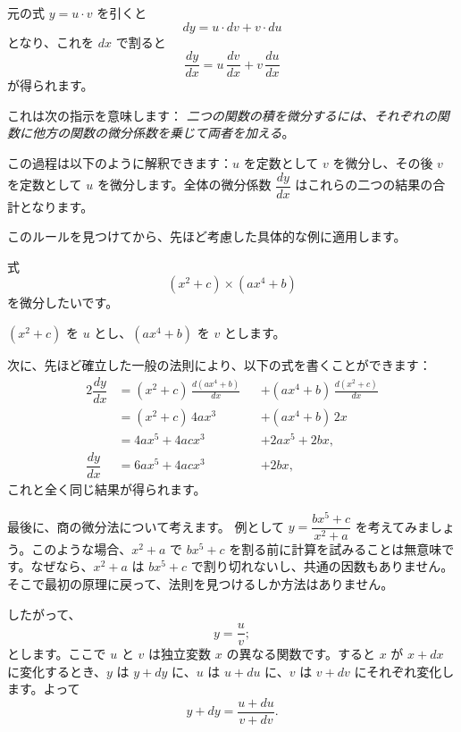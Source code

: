 \documentclass[a4paper,11pt,openany]{ltjsbook}
\begin{document}
元の式 $y = u· v$ を引くと
\[
dy = u · dv + v · du
\]
となり、これを $dx$ で割ると
\[
\dfrac{dy}{dx} = u\, \dfrac{dv}{dx} + v\, \dfrac{du}{dx}
\]
が得られます。

これは次の指示を意味します：
\emph{二つの関数の積を微分するには、それぞれの関数に他方の関数の微分係数を乗じて両者を加える}。

この過程は以下のように解釈できます：$u$ を定数として $v$ を微分し、その後 $v$ を定数として $u$ を微分します。全体の微分係数 $\dfrac{dy}{dx}$ はこれらの二つの結果の合計となります。

このルールを見つけてから、先ほど考慮した具体的な例に適用します。

式
\[
(x^2 + c) \times  (ax^4 + b)
\]
を微分したいです。

$(x^2 + c)$ を $u$ とし、$(ax^4 + b)$ を $v$ とします。

次に、先ほど確立した一般の法則により、以下の式を書くことができます：
\begin{alignat*}{2}
\dfrac{dy}{dx} &= (x^2 + c) \, \frac{d(ax^4 + b)}{dx} &&+ (ax^4 + b) \, \frac{d(x^2 + c)}{dx} \\
              &= (x^2 + c) \, 4ax^3                  &&+ (ax^4 + b) \, 2x \\
              &= 4ax^5 + 4acx^3                     &&+ 2ax^5 + 2bx,  \\
%
\dfrac{dy}{dx} &= 6ax^5 + 4acx^3                     &&+ 2bx,
\end{alignat*}
これと全く同じ結果が得られます。

最後に、商の微分法について考えます。
例として $y = \dfrac{bx^5 + c}{x^2 + a}$ を考えてみましょう。このような場合、$x^2 + a$ で $bx^5 + c$ を割る前に計算を試みることは無意味です。なぜなら、$x^2 + a$ は $bx^5 + c$ で割り切れないし、共通の因数もありません。そこで最初の原理に戻って、法則を見つけるしか方法はありません。

したがって、
\[
y = \frac{u}{v};
\]
とします。ここで $u$ と $v$ は独立変数 $x$ の異なる関数です。すると $x$ が $x + dx$ に変化するとき、$y$ は $y + dy$ に、$u$ は $u + du$ に、$v$ は $v + dv$ にそれぞれ変化します。よって
\[
y + dy = \frac{u + du}{v + dv}.
\]
\end{document}
